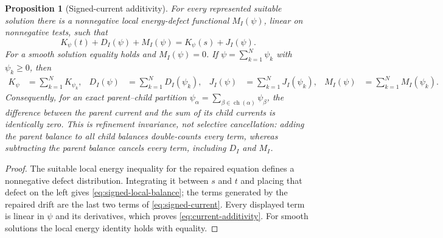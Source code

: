 \documentclass[11pt]{amsart}
\numberwithin{equation}{section}
\theoremstyle{plain}
\newtheorem{proposition}[proposition]{Proposition}
\theoremstyle{definition}
\theoremstyle{remark}
\begin{document}
\begin{proposition}[Signed-current additivity]
\label{prop:signed-current-additivity}
For every represented suitable solution there is a nonnegative local
energy-defect functional \(M_I(\psi)\), linear on nonnegative tests, such that
\begin{equation}\label{eq:signed-local-balance}
 K_\psi(t)+D_I(\psi)+M_I(\psi)
 = K_\psi(s)+J_I(\psi).
\end{equation}
For a smooth solution equality holds and \(M_I(\psi)=0\).  If
\(\psi=\sum_{k=1}^N\psi_k\) with \(\psi_k\ge0\), then
\begin{align}
 K_\psi&=\sum_{k=1}^NK_{\psi_k},
 &D_I(\psi)&=\sum_{k=1}^ND_I(\psi_k),
 &J_I(\psi)&=\sum_{k=1}^NJ_I(\psi_k),
 &M_I(\psi)&=\sum_{k=1}^NM_I(\psi_k).
 \label{eq:current-additivity}
\end{align}
Consequently, for an exact parent--child partition
\(\psi_\alpha=\sum_{\beta\in\operatorname{ch}(\alpha)}\psi_\beta\),
the difference between the parent current and the sum of its child currents
is identically zero.  This is refinement invariance, not selective
cancellation: adding the parent balance to all child balances double-counts
every term, whereas subtracting the parent balance cancels every term,
including \(D_I\) and \(M_I\).
\end{proposition}

\begin{proof}
The suitable local energy inequality for the repaired equation defines a
nonnegative defect distribution.  Integrating it between \(s\) and \(t\) and
placing that defect on the left gives
\eqref{eq:signed-local-balance}; the terms generated by the repaired drift are
the last two terms of \eqref{eq:signed-current}.  Every displayed term is linear in
\(\psi\) and its derivatives, which proves
\eqref{eq:current-additivity}.  For smooth solutions the local energy
identity holds with equality.
\end{proof}
\end{document}
